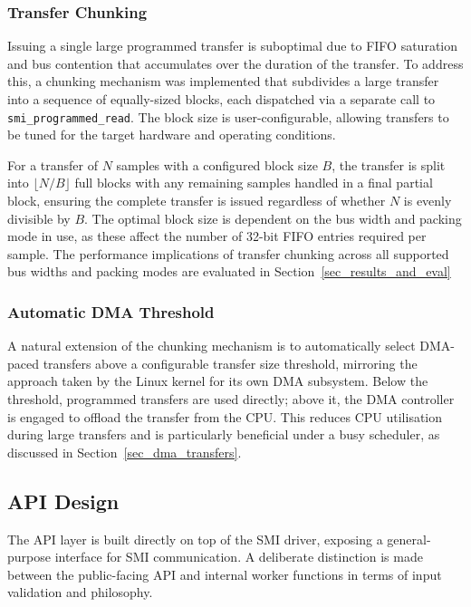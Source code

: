 \documentclass[final]{cmpreport}
\begin{document}
\subsubsection{Transfer Chunking}
Issuing a single large programmed transfer is suboptimal due to FIFO saturation and bus contention that accumulates over the duration of the transfer. To address this, a chunking mechanism was implemented that subdivides a large transfer into a sequence of equally-sized blocks, each dispatched via a separate call to \texttt{smi\_prog\-rammed\_read}. The block size is user-configurable, allowing transfers to be tuned for the target hardware and operating conditions.

For a transfer of $N$ samples with a configured block size $B$, the transfer is split into $\lfloor N/B \rfloor$ full blocks with any remaining samples handled in a final partial block, ensuring the complete transfer is issued regardless of whether $N$ is evenly divisible by $B$. The optimal block size is dependent on the bus width and packing mode in use, as these affect the number of 32-bit FIFO entries required per sample. The performance implications of transfer chunking across all supported bus widths and packing modes are evaluated in Section~\ref{sec_results_and_eval}

\subsubsection{Automatic DMA Threshold}
A natural extension of the chunking mechanism is to automatically select DMA-paced transfers above a configurable transfer size threshold, mirroring the approach taken by the Linux kernel for its own DMA subsystem. Below the threshold, programmed transfers are used directly; above it, the DMA controller is engaged to offload the transfer from the CPU\@. This reduces CPU utilisation during large transfers and is particularly beneficial under a busy scheduler, as discussed in Section~\ref{sec_dma_transfers}.

\subsection{API Design}
The API layer is built directly on top of the SMI driver, exposing a general-purpose interface for SMI communication. A deliberate distinction is made between the public-facing API and internal worker functions in terms of input validation and philosophy. 
\end{document}
